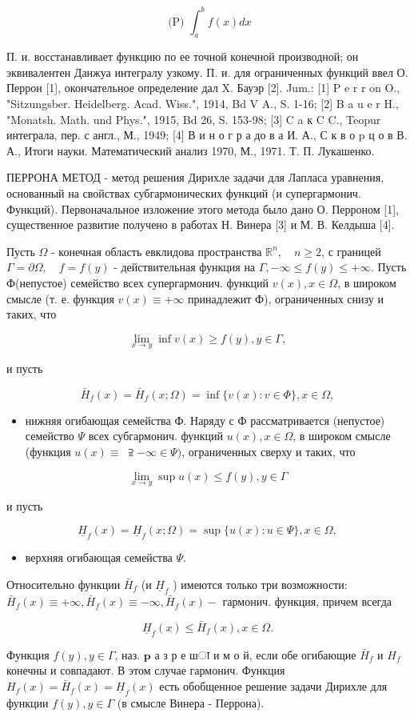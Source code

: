 \documentclass[10pt]{article}
\begin{document}
\[
\text { (P) } \int_{a}^{b} f(x) d x
\]

П. и. восстанавливает функцию по ее точной конечной производной; он эквивалентен Данжуа интегралу узкому. П. и. для ограниченных функций ввел О. Перрон [1], окончательное определение дал X. Бауэр [2]. Jum.: [1] P e r r on O., "Sitzungsber. Heidelberg. Acad. Wiss.", 1914, Bd V A., S. 1-16; [2] B a u e r H., "Monatsh. Math.
und Phys.", 1915, Bd 26, S. 153-98; [3] C a к C C., Teopur интеграла, пер. с англ., М., 1949; [4] В и н о г р а до в а И. А., С к в о p ц о в В. А., Итоги науки. Математический анализ 1970, М., 1971. Т. П. Лукашенко.

ПЕРРОНА МЕТОД - метод решения Дирихле задачи для Лапласа уравнения, основанный на свойствах субгармонических функций (и супергармонич. Функций). Первоначальное изложение этого метода было дано О. Перроном [1], существенное развитие получено в работах Н. Винера [3] и М. В. Келдыша [4].

Пусть $\Omega$ - конечная область евклидова пространства $\mathbb{R}^{n}, \quad n \geqslant 2$, с границей $\Gamma=\partial \Omega, \quad f=f(y)$ - действительная функция на $\Gamma,-\infty \leqslant f(y) \leqslant+\infty$. Пусть Ф(непустое) семейство всех супергармонич. функций $v(x), x \in \Omega$, в широком смысле (т. е. функция $v(x) \equiv+\infty$ принадлежит Ф), ограниченных снизу и таких, что

\[
\lim _{x \rightarrow y} \inf v(x) \geqslant f(y), y \in \Gamma,
\]

и пусть

\[
\bar{H}_{f}(x)=\bar{H}_{f}(x ; \Omega)=\inf \{v(x): v \in \Phi\}, x \in \Omega,
\]

\begin{itemize}
  \item нижняя огибающая семейства Ф. Наряду с Ф рассматривается (непустое) семейство $\Psi$ всех субгармонич. функций $u(x), x \in \Omega$, в широком смысле (функция $u(x) \equiv$ $\supseteqq-\infty \in \Psi)$, ограниченных сверху и таких, что
\end{itemize}

\[
\lim _{x \rightarrow y} \sup u(x) \leqslant f(y), y \in \Gamma
\]

и пусть

\[
\underline{H}_{f}(x)=\underline{H}_{f}(x ; \Omega)=\sup \{u(x): u \in \Psi\}, x \in \Omega,
\]

\begin{itemize}
  \item верхняя огибающая семейства $\Psi$.
\end{itemize}

Относительно функции $\bar{H}_{f}$ (и $\underline{H}_{f}$ ) имеются только три возможности: $\bar{H}_{f}(x) \equiv+\infty, \bar{H}_{f}(x) \equiv-\infty, \bar{H}_{f}(x)-$ гармонич. функция, причем всегда

\[
\underline{H}_{f}(x) \leqslant \bar{H}_{f}(x), x \in \Omega .
\]

Функция $f(y), y \in \Gamma$, наз. $\mathbf{p}$ а з р е шा и м о й, если обе огибающие $\bar{H}_{f}$ и $H_{f}$ конечны и совпадают. В этом случае гармонич. Функция $H_{f}(x)=\bar{H}_{f}(x)=\underline{H}_{f}(x)$ есть обобщенное решение задачи Дирихле для функции $f(y), y \in \Gamma$ (в смысле Винера - Перрона).
\end{document}
